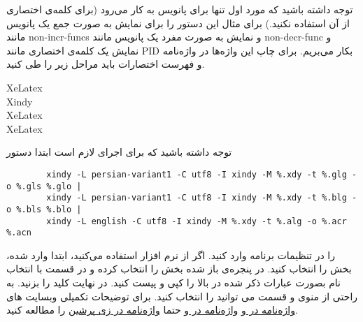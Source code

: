 توجه داشته باشید که مورد اول تنها برای پانویس به کار می‌رود (برای کلمه‌ی اختصاری از آن استفاده نکنید.) برای مثال این دستور را برای نمایش به صورت جمع یک پانویس مانند
\glspl{non-incr-func}
 و نمایش به صورت مفرد یک پانویس مانند
\gls{non-decr-func} 
و نمایش یک کلمه‌ی اختصاری مانند
\gls{PID}
بکار می‌بریم. برای چاپ این واژه‌ها در واژه‌نامه و فهرست اختصارات باید مراحل زیر را طی کنید. 
\begin{latin}
	\noindent
	XeLatex \\
	Xindy \\
	XeLatex\\
	XeLatex\\
\end{latin}
توجه داشته باشید که برای اجرای 
لازم است ابتدا دستور

\begin{latin}
	\noindent
	\footnotesize
	\begin{verbatim}
		xindy -L persian-variant1 -C utf8 -I xindy -M %.xdy -t %.glg -o %.gls %.glo | 
		xindy -L persian-variant1 -C utf8 -I xindy -M %.xdy -t %.blg -o %.bls %.blo |
		xindy -L english -C utf8 -I xindy -M %.xdy -t %.alg -o %.acr %.acn
	\end{verbatim}
\end{latin}
\normalsize
را در تنظیمات برنامه‌ وارد کنید. اگر از نرم افزار 
استفاده می‌کنید، ابتدا وارد 
شده، بخش 
را انتخاب کنید. در پنجره‌ی باز شده بخش 
را انتخاب کرده و در قسمت 
با انتخاب نام بصورت 
عبارات ذکر شده در بالا را کپی و پیست کنید. در نهایت کلید 
را بزنید. به راحتی از منوی 
و قسمت 
می توانید 
را انتخاب کنید. برای توضیحات تکمیلی وبسایت های 
\linebreak
	\href{https://www.overleaf.com/learn/latex/Glossaries}
	{واژه‌نامه در 
	} 
	و 
	\href{https://en.wikibooks.org/wiki/LaTeX/Glossary} 
	{واژه‌نامه در 
		}  
	و حتما 
	\href{http://www.parsilatex.com/wiki/%D8%B1%D8%A7%D9%87%D9%86%D9%85%D8%A7%DB%8C_%D8%A7%DB%8C%D8%AC%D8%A7%D8%AF_%D9%88%D8%A7%DA%98%D9%87%E2%80%8C%D9%86%D8%A7%D9%85%D9%87}{واژه‌نامه در زی پرشین}
را مطالعه کنید. 

